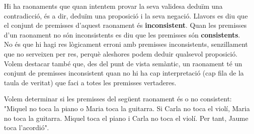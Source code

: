 \bigskip

Hi ha raonaments que quan intentem provar la seva validesa deduïm una
contradicció, és a dir, deduïm una proposició i la seva
negació. Llavors es diu que el conjunt de premisses d'aquest raonament
és \textbf{inconsistent}. Quan les premisses d'un raonament no són
inconsistents es diu que les premisses són \textbf{consistents}. No és que hi hagi res lògicament erroni amb premisses inconsistents,
senzillament que no serveixen per res, perquè aleshores podem deduir
qualsevol proposició. Volem destacar també que, des del punt de
vista semàntic, un raonament té un conjunt de premisses inconsistent
quan no hi ha cap interpretació (cap fila de la taula de veritat) que
faci a totes les premisses vertaderes.

\begin{exemple}
Volem determinar si les premisses del següent raonament és o no
consistent: "Miquel no toca la piano o Maria toca la guitarra. Si Carla no
toca el violí, Maria no toca la guitarra. Miquel toca el piano i Carla
no toca el violí. Per tant, Jaume toca l'acordió".
\end{exemple}

